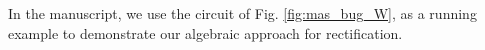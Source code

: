 In the manuscript, we use the circuit of Fig. \ref{fig:mas_bug_W},
 as a running example to
demonstrate our algebraic approach for rectification.  

